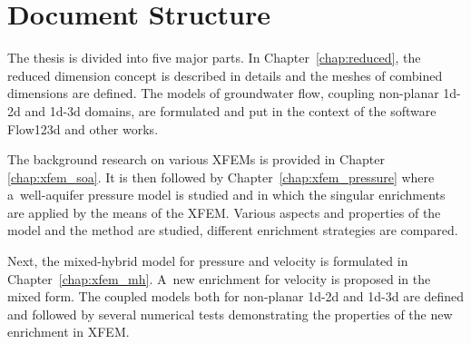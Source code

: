 


\section{Document Structure} \label{sec:structure}

The thesis is divided into five major parts.
In Chapter~\ref{chap:reduced}, the reduced dimension concept is described in details and the meshes of combined dimensions are defined.
The models of groundwater flow, coupling non-planar 1d-2d and 1d-3d domains, are formulated and put in the context of the software Flow123d 
and other works.

The background research on various XFEMs is provided in Chapter \ref{chap:xfem_soa}.
It is then followed by Chapter~\ref{chap:xfem_pressure} where a~well-aquifer pressure model is studied and
in which the singular enrichments are applied by the means of the XFEM.
Various aspects and properties of the model and the method are studied, different enrichment strategies are compared. 

Next, the mixed-hybrid model for pressure and velocity is formulated in Chapter~\ref{chap:xfem_mh}.
A~new enrichment for velocity is proposed in the mixed form.
The coupled models both for non-planar 1d-2d and 1d-3d are defined and followed by several
numerical tests demonstrating the properties of the new enrichment in XFEM.

